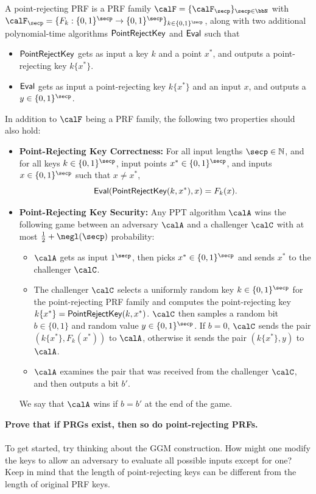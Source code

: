 \documentclass{article}
\begin{document}
\begin{definition}
A point-rejecting PRF is a PRF family $\calF = \{\calF_{\secp}\}_{\secp \in \bbN}$ with $\calF_{\secp} = \{ F_k : \{0, 1\}^{\secp} \to \{0, 1\}^{\secp} \}_{k \in \{0, 1\}^{\secp}}$, along with two additional polynomial-time algorithms $\mathsf{PointRejectKey}$ and $\mathsf{Eval}$ such that 
\begin{itemize}
    \item $\mathsf{PointRejectKey}$ gets as input a key $k$ and a point $x^{*}$, and outputs a point-rejecting key $k\{x^{*}\}$.
    \item $\mathsf{Eval}$ gets as input a point-rejecting key $k\{x^{*}\}$ and an input $x$, and outputs a $y \in \{0, 1\}^{\secp}$. 
\end{itemize}
In addition to $\calF$ being a PRF family, the following two properties should also hold: 
\begin{itemize}
    \item \textbf{Point-Rejecting Key Correctness:} For all input lengths $\secp \in \mathbb{N}$, and for all keys $k \in \{0, 1\}^{\secp}$, input points $x^{*} \in \{0, 1\}^{\secp}$, and inputs $x \in \{0, 1\}^{\secp}$ such that $x \neq x^{*}$, 
        \[ \mathsf{Eval}(\mathsf{PointRejectKey}(k, x^{*}), x) = F_k(x). \]
    \item \textbf{Point-Rejecting Key Security:} Any PPT algorithm $\calA$ wins the following game between an adversary $\calA$ and a challenger $\calC$ with at most $\frac{1}{2}+\negl(\secp)$ probability: 
    \begin{itemize}
        \item $\calA$ gets as input $1^{\secp}$, then picks $x^{*} \in \{0, 1\}^{\secp}$ and sends $x^{*}$ to the challenger $\calC$.
        \item The challenger $\calC$ selects a uniformly random key $k \in \{0, 1\}^{\secp}$ for the point-rejecting PRF family and computes the point-rejecting key $k\{x^{*}\} = \mathsf{PointRejectKey}(k, x^{*})$. $\calC$ then samples a random bit $b \in \{0, 1\}$ and random value $y \in \{0, 1\}^{\secp}$. If $b = 0$, $\calC$ sends the pair $(k\{x^{*}\}, F_k(x^{*}))$ to $\calA$, otherwise it sends the pair $(k\{x^{*}\}, y)$ to $\calA$. 
        \item $\calA$ examines the pair that was received from the challenger $\calC$, and then outputs a bit $b'$.
    \end{itemize}
    We say that $\calA$ wins if $b = b'$ at the end of the game. 
\end{itemize}
\end{definition}
\noindent \textbf{Prove that if PRGs exist, then so do point-rejecting PRFs.}
\\ \\
\noindent To get started, try thinking about the GGM construction. How might one modify the keys to allow an adversary to evaluate all possible inputs except for one? Keep in mind that the length of point-rejecting keys can be different from the length of original PRF keys.
\end{document}
